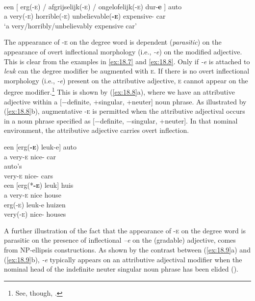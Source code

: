 \documentclass[output=paper]{langsci/langscibook}
\begin{document}
\ea%
    \label{ex:18.6}\\
    \gll een  [ erg(-\textsc{e})  /  afgrijselijk(\textsc{-e})  /  ongelofelijk(\textsc{-e})    dur-\textbf{e} ]                  auto\\
    a  {}    very(-\textsc{e})  {}  horrible(-\textsc{e})  {}  unbelievable(\textbf{\textsc{-e}})  expensive-\Agr{} {} car \\
    \glt ‘a very/horribly/unbelievably expensive car’
\z

The appearance of \textsc{-e} on the degree word is dependent
(\emph{parasitic}) on the appearance of overt inflectional morphology (i.e.,
\emph{-e}) on the modified adjective. This is clear from the examples in
\eqref{ex:18.7} and \eqref{ex:18.8}. Only if \emph{-e} is attached to
\emph{leuk} can the degree modifier be augmented with \textsc{e}. If there is
no overt inflectional morphology (i.e., \emph{-e}) present on the attributive
adjective, \textsc{e} cannot appear on the degree modifier.\footnote{See,
though, .} This is shown by (\ref{ex:18.8}a), where we
have an attributive adjective within a [−definite, +singular, +neuter] noun
phrase. As illustrated by (\ref{ex:18.8}b), augmentative \textsc{-e} is
permitted when the attributive adjectival occurs in a noun phrase specified as
[−definite, −singular, +neuter]. In that nominal environment, the attributive
adjective carries overt inflection.

\begin{multicols}{2}\ea%
    \label{ex:18.7}
	\ea
	\gll een  [erg(\textbf{\textsc{-e}})    leuk-e]      auto\\
	         a      very-\textsc{e}      nice-\Agr{}    car \\
	    \glt
	\ex
	      auto's\\
		very-\textsc{e}    nice-\Agr{}    cars\\
	\glt
	\z
\ex%
    \label{ex:18.8}
	\ea
	\gll een  [erg(*\textbf{\textsc{-e}})    leuk]    huis\\
	        a        very-\textsc{e}        nice      house\\
	    \glt
	\ex
	\gll erg(\textsc{-e})      leuk-e        huizen\\
		very(\textsc{-e)}    nice-\Agr{}    houses\\
	\glt
	\z
\z\end{multicols}

A further illustration of the fact that the appearance of \textsc{-e} on the
degree word is parasitic on the presence of inflectional \emph{–e} on the
(gradable) adjective, comes from NP-ellipsis constructions. As shown by the
contrast between (\ref{ex:18.9}a) and (\ref{ex:18.9}b), \emph{-e} typically
appears on an attributive adjectival modifier when the nominal head of the
indefinite neuter singular noun phrase has been elided
(\citealt{Kester1996,CorvervanKoppen2011}).
\end{document}
